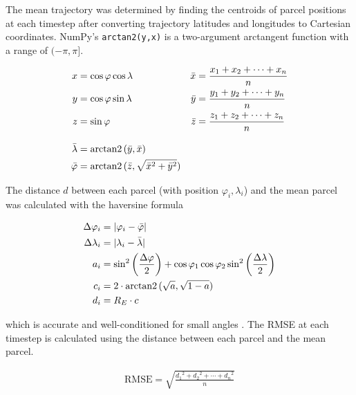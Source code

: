 The mean trajectory was determined by finding the centroids of parcel positions at each timestep after converting trajectory latitudes and longitudes to Cartesian coordinates. 
NumPy's \texttt{arctan2(y,x)} is a two-argument arctangent function with a range of $(-\pi, \pi]$.

\begin{align}
x &= \cos \varphi \cos \lambda & \bar{x} &= \frac{x_1 + x_2 + \cdots + x_n}{n} \\
y &= \cos \varphi \sin \lambda & \bar{y} &= \frac{y_1 + y_2 + \cdots + y_n}{n} \\
z &= \sin \varphi & \bar{z} &= \frac{z_1 + z_2 + \cdots + z_n}{n} \\[2ex]
\bar{\lambda} &= \operatorname{arctan2}{(\bar{y},\bar{x})} \\
\bar{\varphi} &= \operatorname{arctan2}{(\bar{z}, \sqrt{\bar{x}^2 + \bar{y}^2})}
\end{align}

The distance $d$ between each parcel (with position $\varphi_i, \lambda_i$) and the mean parcel was calculated with the haversine formula

\begin{align}
\Delta \varphi_i &= | \varphi_i - \bar{\varphi}| \\
\Delta \lambda_i &= |\lambda_i - \bar{\lambda}| \\
a_i &= \sin^2 \left ( \frac{\Delta \varphi}{2} \right ) + \cos{\varphi_1}  \cos{\varphi_2} \sin^2 \left ( \frac{\Delta \lambda}{2} \right ) \\
c_i &= 2 \cdot \operatorname{arctan2}{(\sqrt{a}, \sqrt{1 - a})} \\
d_i &= R_E \cdot c
\end{align}

which is accurate and well-conditioned for small angles \cite{sinnott_virtues_1984}. 
The RMSE at each timestep is calculated using the distance between each parcel and the mean parcel.

\begin{align}
\text{RMSE} = \sqrt{\frac{{d_1}^2 + {d_2}^2 + \cdots + {d_n}^2}{n}}
\end{align}
